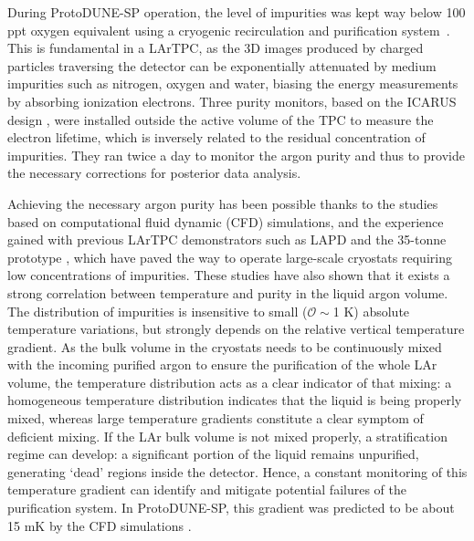 
During ProtoDUNE-SP operation, the level of impurities was kept way below 100 ppt oxygen equivalent using a cryogenic recirculation and purification system~\cite{pdsp_tdr,pdsp_2}. This is fundamental in a LArTPC, as the 3D images produced by charged particles traversing the detector can be exponentially attenuated by medium impurities such as nitrogen, oxygen and water, biasing the energy measurements by absorbing ionization electrons. Three purity monitors, based on the ICARUS design \cite{PrMs}, were installed outside the active volume of the TPC to measure the electron lifetime, which is inversely related to the residual concentration of impurities. They ran twice a day to monitor the argon purity and thus to provide the necessary corrections for posterior data analysis. 

Achieving the necessary argon purity has been possible thanks to the studies based on computational fluid dynamic (CFD) simulations, and the experience gained with previous LArTPC demonstrators such as LAPD \cite{lapd} and the 35-tonne prototype \cite{35t_1,35t_2}, which have paved the way to operate large-scale cryostats requiring low concentrations of impurities. These studies have also shown that it exists a strong correlation between temperature and purity in the liquid argon volume. The distribution of impurities is insensitive to small ($\mathcal{O}\sim$1 K) absolute temperature variations, but strongly depends on the relative vertical temperature gradient. As the bulk volume in the cryostats needs to be continuously mixed with the incoming purified argon to ensure the purification of the whole LAr volume, the temperature distribution acts as a clear indicator of that mixing: a homogeneous temperature distribution indicates that the liquid is being properly mixed, whereas large temperature gradients constitute a clear symptom of deficient mixing. If the LAr bulk volume is not mixed properly, a stratification regime can develop: a significant portion of the liquid remains unpurified, generating `dead' regions inside the detector. Hence, a constant monitoring of this temperature gradient can identify and mitigate potential failures of the purification system. In ProtoDUNE-SP, this gradient was predicted to be about 15 mK by the CFD simulations \cite{pdsp_tdr,dune_tdr4}. 

